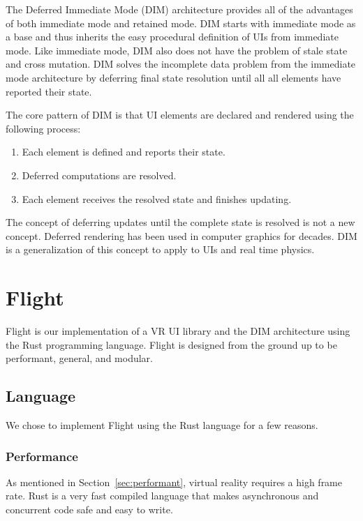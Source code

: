 \documentclass[conference,12pt]{IEEEtran}
\begin{document}
The Deferred Immediate Mode (DIM) architecture provides all of the advantages of
both immediate mode and retained mode. DIM starts with immediate mode as a base
and thus inherits the easy procedural definition of UIs from immediate mode.
Like immediate mode, DIM also does not have the problem of stale state and cross
mutation.  DIM solves the incomplete data problem from the immediate mode
architecture by deferring final state resolution until all all elements have
reported their state.

The core pattern of DIM is that UI elements are declared and rendered using the
following process:
\begin{enumerate}
    \item Each element is defined and reports their state.
    \item Deferred computations are resolved.
    \item Each element receives the resolved state and finishes updating.
\end{enumerate}

The concept of deferring updates until the complete state is resolved is not a
new concept. Deferred rendering has been used in computer graphics for decades.
DIM is a generalization of this concept to apply to UIs and real time physics.

\section{Flight}\label{sec:flight}

Flight is our implementation of a VR UI library and the DIM architecture using
the Rust programming language. Flight is designed from the ground up to be
performant, general, and modular.

\subsection{Language}

We chose to implement Flight using the Rust language for a few reasons.

\subsubsection{Performance}

As mentioned in Section~\ref{sec:performant}, virtual reality requires a high
frame rate. Rust is a very fast compiled language that makes asynchronous and
concurrent code safe and easy to write.
\end{document}
